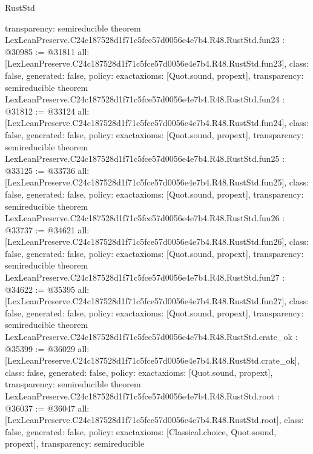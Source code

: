 \begin{lexlean}{RustStd}
\begin{coremodule}
{  transparency: semireducible
}
theorem LexLeanPreserve.C24c187528d1f71c5fce57d0056e4e7b4.R48.RustStd.fun23 : @30985 := @31811 {
  all: [LexLeanPreserve.C24c187528d1f71c5fce57d0056e4e7b4.R48.RustStd.fun23],
  class: false,
  generated: false,
  policy: exact{axioms: [Quot.sound, propext]},
  transparency: semireducible
}
theorem LexLeanPreserve.C24c187528d1f71c5fce57d0056e4e7b4.R48.RustStd.fun24 : @31812 := @33124 {
  all: [LexLeanPreserve.C24c187528d1f71c5fce57d0056e4e7b4.R48.RustStd.fun24],
  class: false,
  generated: false,
  policy: exact{axioms: [Quot.sound, propext]},
  transparency: semireducible
}
theorem LexLeanPreserve.C24c187528d1f71c5fce57d0056e4e7b4.R48.RustStd.fun25 : @33125 := @33736 {
  all: [LexLeanPreserve.C24c187528d1f71c5fce57d0056e4e7b4.R48.RustStd.fun25],
  class: false,
  generated: false,
  policy: exact{axioms: [Quot.sound, propext]},
  transparency: semireducible
}
theorem LexLeanPreserve.C24c187528d1f71c5fce57d0056e4e7b4.R48.RustStd.fun26 : @33737 := @34621 {
  all: [LexLeanPreserve.C24c187528d1f71c5fce57d0056e4e7b4.R48.RustStd.fun26],
  class: false,
  generated: false,
  policy: exact{axioms: [Quot.sound, propext]},
  transparency: semireducible
}
theorem LexLeanPreserve.C24c187528d1f71c5fce57d0056e4e7b4.R48.RustStd.fun27 : @34622 := @35395 {
  all: [LexLeanPreserve.C24c187528d1f71c5fce57d0056e4e7b4.R48.RustStd.fun27],
  class: false,
  generated: false,
  policy: exact{axioms: [Quot.sound, propext]},
  transparency: semireducible
}
theorem LexLeanPreserve.C24c187528d1f71c5fce57d0056e4e7b4.R48.RustStd.crate_ok : @35399 := @36029 {
  all: [LexLeanPreserve.C24c187528d1f71c5fce57d0056e4e7b4.R48.RustStd.crate_ok],
  class: false,
  generated: false,
  policy: exact{axioms: [Quot.sound, propext]},
  transparency: semireducible
}
theorem LexLeanPreserve.C24c187528d1f71c5fce57d0056e4e7b4.R48.RustStd.root : @36037 := @36047 {
  all: [LexLeanPreserve.C24c187528d1f71c5fce57d0056e4e7b4.R48.RustStd.root],
  class: false,
  generated: false,
  policy: exact{axioms: [Classical.choice, Quot.sound, propext]},
  transparency: semireducible
}


\end{coremodule}
\end{lexlean}
